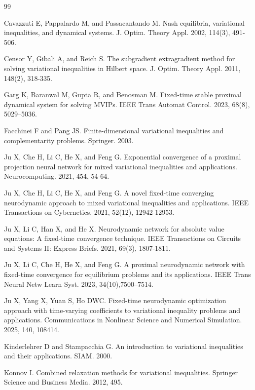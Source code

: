\documentclass{article}
\theoremstyle{plain}%
\theoremstyle{thmstyletwo}%
\theoremstyle{thmstylethree}%
\begin{document}
\begin{thebibliography}{99}

Cavazzuti E, Pappalardo M, and  Passacantando M. Nash equilibria, variational inequalities, and dynamical systems. J. Optim. Theory Appl. 2002, 114(3), 491-506.

Censor Y, Gibali A, and Reich S. The subgradient extragradient method for solving variational inequalities in Hilbert space. J. Optim. Theory Appl. 2011, 148(2), 318-335.

Garg K, Baranwal M, Gupta R, and Benosman M. Fixed-time stable proximal dynamical system for solving MVIPs. IEEE Trans Automat Control. 2023, 68(8), 5029–5036.

Facchinei F and Pang JS. Finite-dimensional variational inequalities and complementarity problems. Springer. 2003.

Ju X, Che H, Li C, He X, and Feng G. Exponential convergence of a proximal projection neural network for mixed variational inequalities and applications. Neurocomputing. 2021, 454, 54-64.

Ju X, Che H, Li C, He X, and Feng G. A novel fixed-time converging neurodynamic approach to mixed variational inequalities and applications. IEEE Transactions on Cybernetics. 2021, 52(12), 12942-12953.

Ju X, Li C, Han X, and He X. Neurodynamic network for absolute value equations: A fixed-time convergence technique. IEEE Transactions on Circuits and Systems II: Express Briefs. 2021, 69(3), 1807-1811.

Ju X, Li C, Che H, He X, and Feng G. A proximal neurodynamic network with fixed-time convergence for equilibrium problems and its applications. IEEE Trans Neural Netw Learn Syst. 2023, 34(10),7500–7514.

Ju X, Yang X, Yuan S, Ho DWC. Fixed-time neurodynamic optimization approach with time-varying coefficients to variational inequality problems and applications. Communications in Nonlinear Science and Numerical Simulation. 2025, 140, 108414. 

Kinderlehrer D and Stampacchia G. An introduction to variational inequalities and their applications. SIAM. 2000.

Konnov I. Combined relaxation methods for variational inequalities. Springer Science and Business Media. 2012, 495.


\end{thebibliography}
\end{document}
